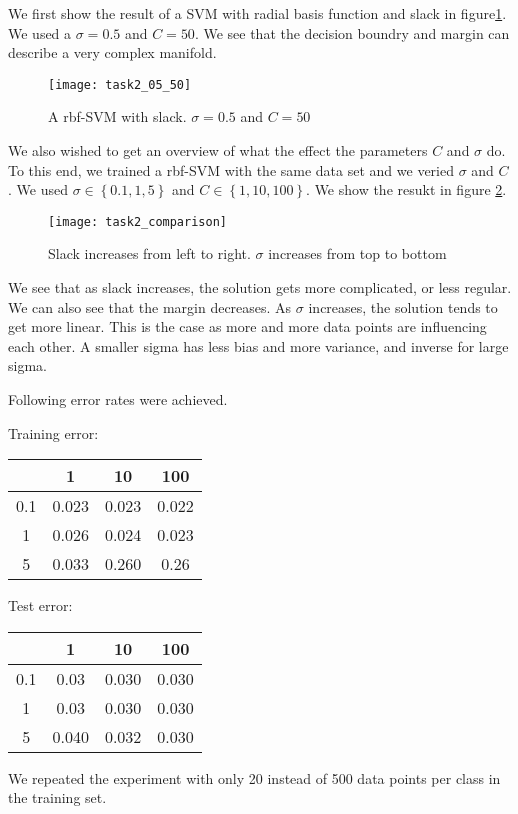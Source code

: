 We first show the result of a SVM with radial basis function and slack in figure\ref{task2::example}. We used a $\sigma = 0.5$ and $C=50$. We see that the decision boundry and margin can  describe a very complex manifold.
\begin{figure}
	\texttt{[image: task2\_05\_50]}
	\caption{A rbf-SVM with slack. $\sigma = 0.5$ and $C=50$}
	\label{task2::example}
\end{figure}

We also wished to get an overview of what the effect the parameters $C$ and $\sigma$ do. To this end, we trained a rbf-SVM with the same data set and we veried $\sigma$ and $C$. We used $\sigma\in\left\{ 0.1, 1, 5 \right\}$ and  $C\in\left\{ 1, 10, 100 \right\}$. We show the resukt in figure \ref{task2::influence}.
\begin{figure}
	\texttt{[image: task2\_comparison]}
	\caption{Slack increases from left to right. $\sigma$ increases from top to bottom}
	\label{task2::influence}
\end{figure}

We see that as slack increases, the solution gets more complicated, or less regular. We can also see that the margin decreases. As $\sigma$ increases, the solution tends to get more linear. This is the case as more and more data points are influencing each other. A smaller sigma has less bias and more variance, and inverse for large sigma.

Following error rates were achieved.

Training error:
\begin{tabular}{|c|c|c|c|}
\hline
&1&10&100\\
\hline
0.1&0.023&0.023&0.022\\
\hline
1&0.026&0.024&0.023\\
\hline
5&0.033&0.260&0.26\\
\hline
\end{tabular}
Test error:
\begin{tabular}{|c|c|c|c|}
\hline
&1&10&100\\
\hline
0.1&0.03&0.030&0.030\\
\hline
1&0.03&0.030&0.030\\
\hline
5&0.040&0.032&0.030\\
\hline
\end{tabular}

We repeated the experiment with only 20 instead of 500 data points per class in the training set.

